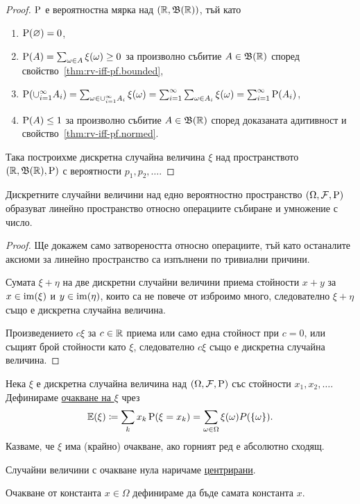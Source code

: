 \documentclass[numbers=endperiod, DIV=15, bibliography=totocnumbered]{scrartcl}
\begin{document}
\begin{proof}
  $\operatorname{P}$ е вероятностна мярка над $(\mathbb{R}, \mathfrak{B}(\mathbb{R}))$, тъй като
  \begin{enumerate}
    \item $\operatorname{P}(\varnothing) = 0$,
    \item $\operatorname{P}(A) = \sum_{\omega \in A} \xi(\omega) \geq 0$ за произволно събитие $A \in \mathfrak{B}(\mathbb{R})$ според свойство~\ref{thm:rv-iff-pf.bounded},
    \item $\operatorname{P}(\cup_{i=1}^\infty A_i) = \sum_{\omega \in \cup_{i=1}^\infty A_i} \xi(\omega) = \sum_{i=1}^\infty \sum_{\omega \in A_i} \xi(\omega) = \sum_{i=1}^\infty \operatorname{P}(A_i)$,
    \item $\operatorname{P}(A) \leq 1$ за произволно събитие $A \in \mathfrak{B}(\mathbb{R})$ според доказаната адитивност и свойство~\ref{thm:rv-iff-pf.normed}.
  \end{enumerate}
  Така построихме дискретна случайна величина $\xi$ над пространството $(\mathbb{R}, \mathfrak{B}(\mathbb{R}), \operatorname{P})$ с вероятности $p_1, p_2, \ldots$.
\end{proof}

\begin{proposition}
  Дискретните случайни величини над едно вероятностно пространство $(\Omega, \mathcal{F}, \operatorname{P})$ образуват линейно пространство относно операциите събиране и умножение с число.
\end{proposition}
\begin{proof}
  Ще докажем само затвореността относно операциите, тъй като останалите аксиоми за линейно пространство са изпълнени по тривиални причини.

  Сумата $\xi + \eta$ на две дискретни случайни величини приема стойности $x + y$ за $x \in \operatorname{im}(\xi)$ и $y \in \operatorname{im}(\eta)$, които са не повече от изброимо много, следователно $\xi + \eta$ също е дискретна случайна величина.

  Произведението $c \xi$ за $c \in \mathbb{R}$ приема или само една стойност при $c = 0$, или същият брой стойности като $\xi$, следователно $c \xi$ също е дискретна случайна величина.
\end{proof}

\begin{definition}
  Нека $\xi$ е дискретна случайна величина над $(\Omega, \mathcal{F}, \operatorname{P})$ със стойности $x_1, x_2, \ldots$. Дефинираме \underline{очакване на $\xi$} чрез
  \begin{displaymath}
    \mathbb{E}(\xi) \coloneqq \sum_k x_k \operatorname{P}(\xi = x_k) = \sum_{\omega \in \Omega} \xi(\omega) P(\{ \omega \}).
  \end{displaymath}
  Казваме, че $\xi$ има (крайно) очакване, ако горният ред е абсолютно сходящ.

  Случайни величини с очакване нула наричаме \underline{центрирани}.

  Очакване от константа $x \in \Omega$ дефинираме да бъде самата константа $x$.
\end{definition}
\end{document}
